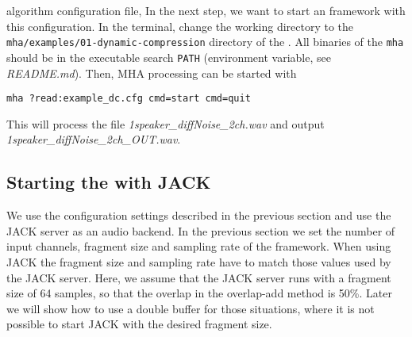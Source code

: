algorithm configuration file, In the next step, we want to start an \mha{}
framework with this configuration.
%
In the terminal, change the working directory to the
\verb!mha/examples/01-dynamic-compression! 
directory of the \mha{}.
All binaries of the \verb!mha! should be in the executable search
\verb!PATH! (environment variable, see \emph{README.md}).
Then, MHA processing can be started with
\begin{verbatim}
mha ?read:example_dc.cfg cmd=start cmd=quit
\end{verbatim}
%
This will process the file \emph{1speaker\_diffNoise\_2ch.wav} and output 
\emph{1speaker\_diffNoise\_2ch\_OUT.wav}.


\subsection{Starting the \mhad{} with JACK}%
\label{sec:example_jack}%
%
%
%

We use the configuration settings described in the previous section 
and use the JACK server as an audio backend. In the previous section we set the number of 
input channels, fragment size and sampling rate of the framework. 
When using JACK the fragment size
and sampling rate have to match those values used by the JACK server.
Here, we assume that the JACK server runs with a fragment size
of 64 samples, so that the overlap in the overlap-add method is
50\%. Later we will show how to use a double buffer for those
situations, where it is not possible to start JACK with the desired
fragment size. 

